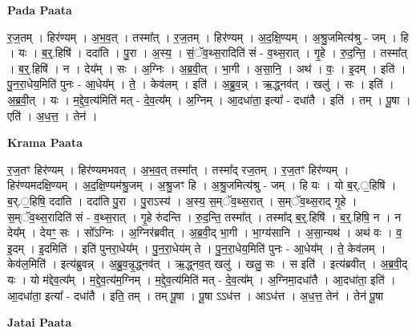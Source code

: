 \documentclass[17pt]{extarticle}
\begin{document}
\textbf{Pada Paata} \newline

र॒ज॒तम् । हिर॑ण्यम् । अ॒भ॒व॒त् । तस्मा᳚त् । र॒ज॒तम् । हिर॑ण्यम् । अ॒द॒क्षि॒ण्यम् । अ॒श्रु॒जमित्य॑श्रु - जम् । हि । यः । ब॒र्॒.हिषि॑ । ददा॑ति । पु॒रा । अ॒स्य॒ । सं॒ॅव॒थ्स॒रादिति॑ सं - व॒थ्स॒रात् । गृ॒हे । रु॒द॒न्ति॒ । तस्मा᳚त् । ब॒र्॒.हिषि॑ । न । देय᳚म् । सः । अ॒ग्निः । अ॒ब्र॒वी॒त् । भा॒गी । अ॒सा॒नि॒ । अथ॑ । वः॒ । इ॒दम् । इति॑ । पु॒न॒रा॒धेय॒मिति॑ पुनः - आ॒धेय᳚म् । ते॒ । केव॑लम् । इति॑ । अ॒ब्रु॒व॒न्न् । ऋ॒द्ध्नव॑त् । खलु॑ । सः । इति॑ । अ॒ब्र॒वी॒त् । यः । म॒द्दे॒व॒त्य॑मिति॑ मत् - दे॒व॒त्य᳚म् । अ॒ग्निम् । आ॒दधा॑ता॒ इत्या᳚ - दधा॑तै । इति॑ । तम् । पू॒षा । एति॑ । अ॒ध॒त्त॒ । तेन॑ ।  \newline


\textbf{Krama Paata} \newline

र॒ज॒तꣳ हिर॑ण्यम् । हिर॑ण्यमभवत् । अ॒भ॒व॒त् तस्मा᳚त् । तस्मा᳚द् रज॒तम् । र॒ज॒तꣳ हिर॑ण्यम् । हिर॑ण्यमदक्षि॒ण्यम् । अ॒द॒क्षि॒ण्यम॑श्रु॒जम् । अ॒श्रु॒जꣳ हि । अ॒श्रु॒जमित्य॑श्रु - जम् । हि यः । यो ब॒र्.॒हिषि॑ । ब॒र्.॒हिषि॒ ददा॑ति । ददा॑ति पु॒रा । पु॒राऽस्य॑ । अ॒स्य॒ स॒म्ॅव॒थ्स॒रात् । स॒म्ॅव॒थ्स॒राद् गृ॒हे । स॒म्ॅव॒थ्स॒रादिति॑ सं - व॒थ्स॒रात् । गृ॒हे रु॑दन्ति । रु॒द॒न्ति॒ तस्मा᳚त् । तस्मा᳚द् ब॒र्॒.हिषि॑ । ब॒र्॒.हिषि॒ न । न देय᳚म् । देयꣳ॒॒ सः । सो᳚ऽग्निः । अ॒ग्निर॑ब्रवीत् । अ॒ब्र॒वी॒द् भा॒गी । भा॒ग्य॑सानि । अ॒सा॒न्यथ॑ । अथ॑ वः । व॒ इ॒दम् । इ॒दमिति॑ । इति॑ पुनरा॒धेय᳚म् । पु॒न॒रा॒धेय॑म् ते । पु॒न॒रा॒धेय॒मिति॑ पुनः - आ॒धेय᳚म् । ते॒ केव॑लम् । केव॑ल॒मिति॑ । इत्य॑ब्रुवन्न् । अ॒ब्रु॒व॒न्नृ॒द्ध्नव॑त् । ऋ॒द्ध्नव॒त् खलु॑ । खलु॒ सः । स इति॑ । इत्य॑ब्रवीत् । अ॒ब्र॒वी॒द् यः । यो म॑द्देव॒त्य᳚म् । म॒द्दे॒व॒त्य॑म॒ग्निम् । म॒द्दे॒व॒त्य॑मिति॑ मत् - दे॒व॒त्य᳚म् । अ॒ग्निमा॒दधा॑तै । आ॒दधा॑ता॒ इति॑ । आ॒दधा॑ता॒ इत्या᳚ - दधा॑तै । इति॒ तम् । तम् पू॒षा । पू॒षा ऽऽध॑त्त । आऽध॑त्त । अ॒ध॒त्त॒ तेन॑ । तेन॑ पू॒षा \newline

\textbf{Jatai Paata} \newline
\end{document}
